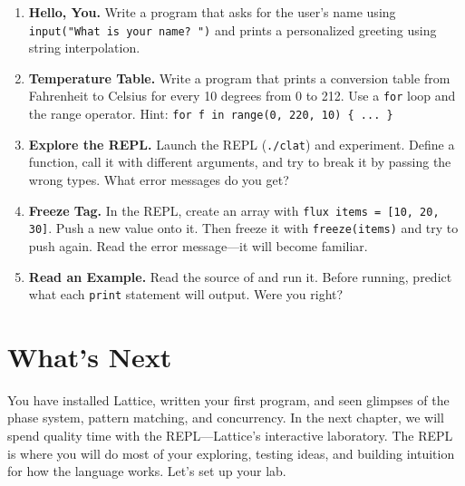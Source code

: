 \begin{enumerate}
  \item \textbf{Hello, You.}
  Write a program that asks for the user's name using \lstinline|input("What is your name? ")| and prints a personalized greeting using string interpolation.

  \item \textbf{Temperature Table.}
  Write a program that prints a conversion table from Fahrenheit to Celsius for every 10 degrees from 0 to 212.
  Use a \lstinline|for| loop and the range operator.
  Hint: \lstinline|for f in range(0, 220, 10) { ... }|

  \item \textbf{Explore the REPL\@.}
  Launch the REPL (\lstinline|./clat|) and experiment.
  Define a function, call it with different arguments, and try to break it by passing the wrong types.
  What error messages do you get?

  \item \textbf{Freeze Tag.}
  In the REPL, create an array with \lstinline|flux items = [10, 20, 30]|.
  Push a new value onto it.
  Then freeze it with \lstinline|freeze(items)| and try to push again.
  Read the error message---it will become familiar.

  \item \textbf{Read an Example.}
  Read the source of  and run it.
  Before running, predict what each \lstinline|print| statement will output.
  Were you right?
\end{enumerate}

\section*{What's Next}\label{sec:ch01-whats-next}

You have installed Lattice, written your first program, and seen glimpses of the phase system, pattern matching, and concurrency.
In the next chapter, we will spend quality time with the REPL---Lattice's interactive laboratory.
The REPL is where you will do most of your exploring, testing ideas, and building intuition for how the language works.
Let's set up your lab.
